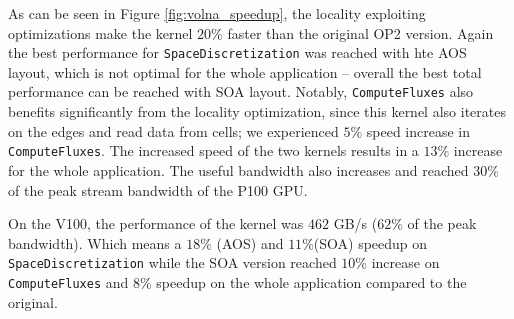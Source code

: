 As can be seen in Figure \ref{fig:volna_speedup}, the locality exploiting 
optimizations make the kernel $20\%$ faster than the original OP2 version.
Again the best performance for \texttt{SpaceDiscretization} was reached with hte AOS 
layout, which is not optimal for the whole application -- overall the best total performance
can be reached with SOA layout. Notably, \texttt{ComputeFluxes} also benefits significantly from the locality optimization, since this kernel also iterates on the edges and read data from cells; we experienced $5\%$ speed increase in \texttt{ComputeFluxes}.
The increased speed of the two kernels results in a $13\%$ increase for the whole
application. The useful bandwidth also increases and reached $30\%$ of the peak
stream bandwidth of the P100 GPU.

On the V100, the performance of the kernel was $462$ GB/s ($62\%$ of the peak bandwidth).
Which means a $18\%$ (AOS) and $11\%$(SOA) speedup on \texttt{SpaceDiscretization}
while the SOA version reached $10\%$ increase on \texttt{ComputeFluxes} and $8\%$
speedup on the whole application compared to the original.



